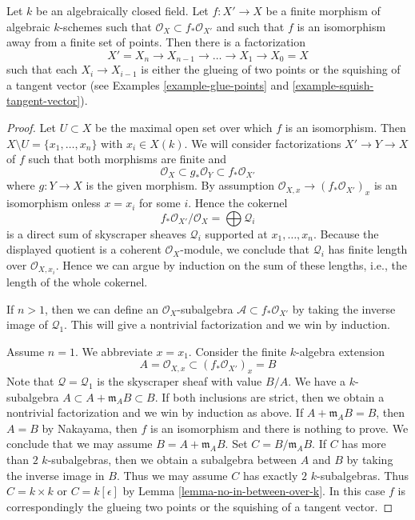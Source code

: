 \begin{lemma}
\label{lemma-factor-almost-isomorphism}
Let $k$ be an algebraically closed field. Let $f : X' \to X$ be a
finite morphism of algebraic $k$-schemes such that
$\mathcal{O}_X \subset f_*\mathcal{O}_{X'}$ and such that $f$ is an
isomorphism away from a finite set of points. Then there is a factorization
$$
X' = X_n \to X_{n - 1} \to \ldots \to X_1 \to X_0 = X
$$
such that each $X_i \to X_{i - 1}$ is either the glueing of
two points or the squishing of a tangent vector
(see Examples \ref{example-glue-points} and
\ref{example-squish-tangent-vector}).
\end{lemma}

\begin{proof}
Let $U \subset X$ be the maximal open set over which $f$ is an isomorphism.
Then $X \setminus U = \{x_1, \ldots, x_n\}$ with $x_i \in X(k)$.
We will consider factorizations $X' \to Y \to X$ of $f$ such that
both morphisms are finite and
$$
\mathcal{O}_X \subset g_*\mathcal{O}_Y \subset f_*\mathcal{O}_{X'}
$$
where $g : Y \to X$ is the given morphism. By assumption
$\mathcal{O}_{X, x} \to (f_*\mathcal{O}_{X'})_x$ is an isomorphism
onless $x = x_i$ for some $i$. Hence the cokernel
$$
f_*\mathcal{O}_{X'}/\mathcal{O}_X = \bigoplus \mathcal{Q}_i
$$
is a direct sum of skyscraper sheaves $\mathcal{Q}_i$ supported at
$x_1, \ldots, x_n$.
Because the displayed quotient is a coherent $\mathcal{O}_X$-module,
we conclude that $\mathcal{Q}_i$ has finite length over
$\mathcal{O}_{X, x_i}$. Hence we can argue
by induction on the sum of these lengths, i.e., the length of
the whole cokernel.

\medskip\noindent
If $n > 1$, then we can define an $\mathcal{O}_X$-subalgebra
$\mathcal{A} \subset f_*\mathcal{O}_{X'}$ by taking the inverse
image of $\mathcal{Q}_1$. This will give a nontrivial factorization
and we win by induction.

\medskip\noindent
Assume $n = 1$. We abbreviate $x = x_1$. Consider the finite
$k$-algebra extension
$$
A = \mathcal{O}_{X, x} \subset (f_*\mathcal{O}_{X'})_x = B
$$
Note that $\mathcal{Q} = \mathcal{Q}_1$ is the skyscraper sheaf
with value $B/A$.
We have a $k$-subalgebra $A \subset A + \mathfrak m_A B \subset B$.
If both inclusions are strict, then we obtain a nontrivial
factorization and we win by induction as above.
If $A + \mathfrak m_A B = B$, then $A = B$ by Nakayama, then
$f$ is an isomorphism and there is nothing to prove.
We conclude that we may assume $B = A + \mathfrak m_A B$.
Set $C = B/\mathfrak m_A B$. If $C$ has more than $2$
$k$-subalgebras, then we obtain a subalgebra between $A$
and $B$ by taking the inverse image in $B$. Thus we may
assume $C$ has exactly $2$ $k$-subalgebras. Thus $C = k \times k$
or $C = k[\epsilon]$ by Lemma \ref{lemma-no-in-between-over-k}.
In this case $f$ is correspondingly the glueing two points or the
squishing of a tangent vector.
\end{proof}

